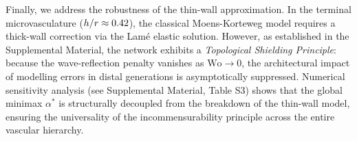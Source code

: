 Finally, we address the robustness of the thin-wall approximation. In the
terminal microvasculature ($h/r \approx 0.42$), the
classical Moens-Korteweg model requires a thick-wall correction via the Lamé
elastic solution. However, as established in the Supplemental Material, the
network exhibits a \emph{Topological Shielding Principle}: because the
wave-reflection penalty vanishes as $\mathrm{Wo} \to 0$, the architectural
impact of modelling errors in distal generations is asymptotically suppressed.
Numerical sensitivity analysis (see Supplemental Material, Table S3) shows
that the global minimax $\alpha^*$ is structurally decoupled from the breakdown
of the thin-wall model, ensuring the universality of the incommensurability
principle across the entire vascular hierarchy.
